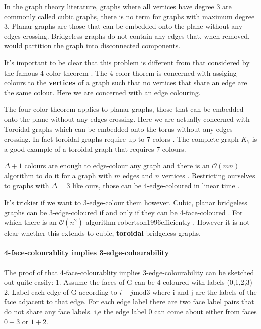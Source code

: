 In the graph theory literature, graphs where all vertices have degree 3
are commonly called cubic graphs, there is no term for graphs with
maximum degree 3. Planar graphs are those that can be embedded onto the
plane without any edges crossing. Bridgeless graphs do not contain any
edges that, when removed, would partition the graph into disconnected
components.

It's important to be clear that this problem is different from that
considered by the famous 4 color theorem
\textcite{appelEveryPlanarMap1989} . The 4 color thorem is concerned
with assiging colours to the \textbf{vertices} of a graph such that no
vertices that share an edge are the same colour. Here we are concerned
with an edge colouring.

The four color theorem applies to planar graphs, those that can be
embedded onto the plane without any edges crossing. Here we are actually
concerned with Toroidal graphs which can be embedded onto the torus
without any edges crossing. In fact toroidal graphs require up to 7
colors \textcite{heawoodMapColouringTheorems} . The complete graph
\(K_7\) is a good example of a toroidal graph that requires 7 colours.

\(\Delta + 1\) colours are enough to edge-colour any graph and there is
an \(\mathcal{O}(mn)\) algorithm to do it for a graph with \(m\) edges
and \(n\) vertices \textcite{gEstimateChromaticClass1964}. Restricting
ourselves to graphs with \(\Delta = 3\) like ours, those can be
4-edge-coloured in linear time
\textcite{skulrattanakulchai4edgecoloringGraphsMaximum2002} .

It's trickier if we want to 3-edge-colour them however. Cubic, planar
bridgeless graphs can be 3-edge-coloured if and only if they can be
4-face-coloured \textcite{tait1880remarks} . For which there is an
\(\mathcal{O}(n^2)\) algorithm robertson1996efficiently . However it is
not clear whether this extends to cubic, \textbf{toroidal} bridgeless
graphs.

\hypertarget{face-colourablity-implies-3-edge-colourability}{%
\paragraph{4-face-colourablity implies
3-edge-colourability}\label{face-colourablity-implies-3-edge-colourability}}

The proof of that 4-face-colourablity implies 3-edge-colourability can
be sketched out quite easily: 1. Assume the faces of G can be 4-coloured
with labels (0,1,2,3) 2. Label each edge of G according to
\(i + j \mathrm{mod} 3\) where i and j are the labels of the face
adjacent to that edge. For each edge label there are two face label
pairs that do not share any face labels. i,e the edge label \(0\) can
come about either from faces \(0 + 3\) or \(1 + 2\).

